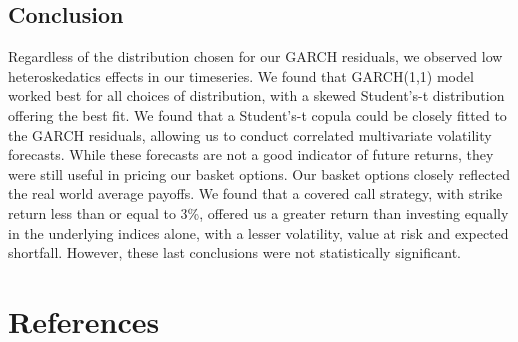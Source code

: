 \documentclass[11pt]{article}
\begin{document}
    
    \subsection{Conclusion}\label{conclusion}

    Regardless of the distribution chosen for our GARCH residuals, we
observed low heteroskedatics effects in our timeseries. We found that
GARCH(1,1) model worked best for all choices of distribution, with a
skewed Student's-t distribution offering the best fit. We found that a
Student's-t copula could be closely fitted to the GARCH residuals,
allowing us to conduct correlated multivariate volatility forecasts.
While these forecasts are not a good indicator of future returns, they
were still useful in pricing our basket options. Our basket options
closely reflected the real world average payoffs. We found that a
covered call strategy, with strike return less than or equal to 3\%,
offered us a greater return than investing equally in the underlying
indices alone, with a lesser volatility, value at risk and expected
shortfall. However, these last conclusions were not statistically
significant.

    \section{References}\label{references}
\end{document}
